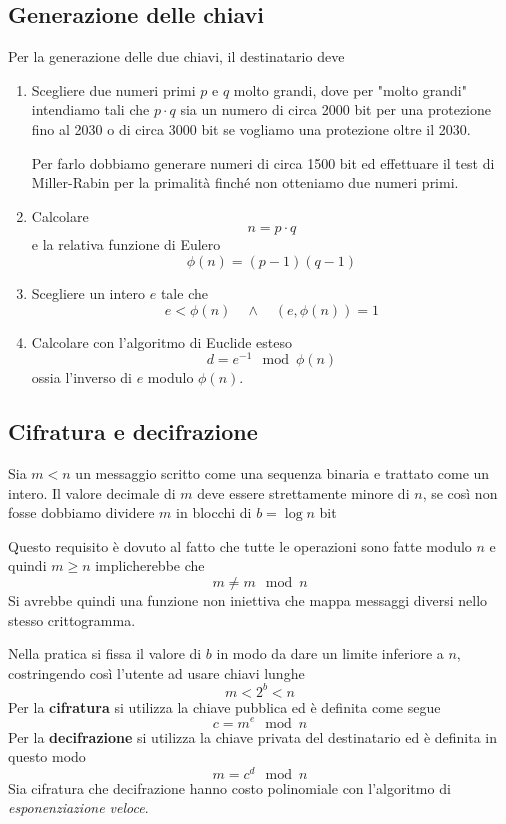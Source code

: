 \subsection{Generazione delle chiavi}
Per la generazione delle due chiavi, il destinatario deve
\begin{enumerate}
	\item Scegliere due numeri primi $p$ e $q$ molto grandi, dove per "molto grandi" intendiamo tali che $p \cdot q$
	      sia un numero di circa 2000 bit per una protezione fino al 2030 o di circa 3000 bit se vogliamo una
	      protezione oltre il 2030.

	      Per farlo dobbiamo generare numeri di circa 1500 bit ed effettuare il test di Miller-Rabin per la
	      primalit\`a finch\'e non otteniamo due numeri primi.
	\item Calcolare
	      \[ n = p \cdot q \]
	      e la relativa funzione di Eulero
	      \[ \phi(n) = (p - 1)(q - 1) \]
	\item Scegliere un intero $e$ tale che
	      \[ e < \phi(n) \quad \wedge \quad (e, \phi(n)) = 1 \]
	\item Calcolare con l'algoritmo di Euclide esteso
	      \[ d = e^{-1} \mod{\phi(n)} \]
	      ossia l'inverso di $e$ modulo $\phi(n)$.
\end{enumerate}

\subsection{Cifratura e decifrazione}
Sia $m < n$ un messaggio scritto come una sequenza binaria e trattato come un intero. Il valore decimale di $m$ deve
essere strettamente minore di $n$, se cos\`i non fosse dobbiamo dividere $m$ in blocchi di $b = \log n$ bit

Questo requisito \`e dovuto al fatto che tutte le operazioni sono fatte modulo $n$ e quindi $m \geq n$ implicherebbe
che
\[ m \neq m \mod{n} \]
Si avrebbe quindi una funzione non iniettiva che mappa messaggi diversi nello stesso crittogramma.

Nella pratica si fissa il valore di $b$ in modo da dare un limite inferiore a $n$, costringendo cos\`i l'utente ad usare
chiavi lunghe
\[ m < 2^b < n \]
Per la \textbf{cifratura} si utilizza la chiave pubblica ed \`e definita come segue
\[ c = m^e \mod{n} \]
Per la \textbf{decifrazione} si utilizza la chiave privata del destinatario ed \`e definita in questo modo
\[ m = c^d \mod{n} \]
Sia cifratura che decifrazione hanno costo polinomiale con l'algoritmo di \emph{esponenziazione veloce}.

